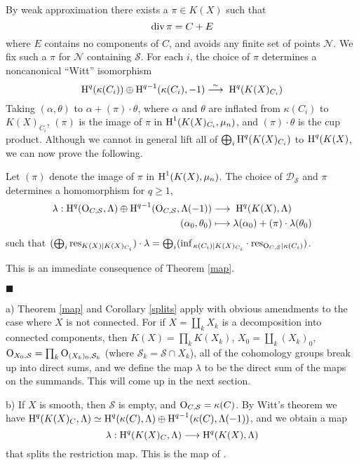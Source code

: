 \documentclass{amsart}
\theoremstyle{plain}
\theoremstyle{definition}
\theoremstyle{remark}
\numberwithin{equation}{section}%
\renewcommand{\H}{{\text{\rm H}}}
\renewcommand{\O}{{\text{\rm O}}}
\renewcommand{\S}{{\mathcal S}}
\renewcommand{\div}{{\text{\rm div}}}
\renewcommand{\inf}{{\text{\rm inf}\,}}
\newcommand{\isim}{{\;\overset{\sim}{\longrightarrow}\;}}
\newcommand{\isom}{{\;\simeq\;}}
\newcommand{\red}{{\text{\rm red}}}
\newcommand{\res}{{\text{\rm res}}}
\newcommand{\Pf}{{\noindent{\it Proof.}\;\;}}
\begin{document}
\Paragraph\label{pi}
By weak approximation \cite[Lemma]{Sa98}
there exists a $\pi\in K(X)$ such that 
$$
\div\,\pi=C+E
$$ 
where $E$ contains no components of $C$, and avoids any finite set of points $\mathcal N$.
We fix such a $\pi$ for $\mathcal N$ containing $\S$. 
For each $i$, the choice of $\pi$ determines a noncanonical ``Witt'' isomorphism 
\[
\H^q(\kappa(C_i))\oplus\H^{q-1}(\kappa(C_i),-1)\isim\;\H^q(K(X)_{C_i})
\]
Taking $(\alpha,\theta)$
to $\alpha+(\pi)\cdot\theta$, where $\alpha$ and $\theta$ are inflated from 
$\kappa(C_i)$ to $K(X)_{C_i}$,
$(\pi)$ is the image of $\pi$ in $\H^1(K(X)_{C_i},\mu_n)$, and $(\pi)\cdot\theta$
is the cup product.
Although we cannot in general lift all of
$\bigoplus_i\H^q(K(X)_{C_i})$ to $\H^q(K(X)$, we can now prove the following.

\Corollary\label{splits}
Let $(\pi)$ denote the image of $\pi$ in $\H^1(K(X),\mu_n)$.
The choice of $\mathscr D_\S$ and $\pi$ determines a homomorphism for $q\geq 1$,
\begin{align*}
\lambda:\H^q(\O_{C,\S},\Lambda)\oplus\H^{q-1}(\O_{C,\S},\Lambda(-1))&\longrightarrow\;\H^q(K(X),\Lambda)\\
(\alpha_0,\theta_0)&\longmapsto \lambda(\alpha_0)+(\pi)\cdot\lambda(\theta_0)
\end{align*}
such that $(\bigoplus_i\res_{K(X)|K(X)_{C_i}})\cdot\lambda
=\bigoplus_i(\inf_{\kappa(C_i)|K(X)_{C_i}}\cdot\res_{\O_{C,\S}|\kappa(C_i)})$.
\rm

\Pf
This is an immediate consequence of Theorem \ref{map}.

\hfill $\blacksquare$

\Remark\label{connected}
a) Theorem \ref{map} and Corollary \ref{splits} 
apply with obvious amendments to the case where $X$ is not connected.  
For if $X=\coprod_k X_k$ is a decomposition into connected components,
then $K(X)=\prod_k K(X_k)$, $X_0=\coprod_k(X_k)_0$, $\O_{X_0,\S}=\prod_k\O_{(X_k)_0,\S_k}$
(where $\S_k=\S\cap X_k$),
all of the cohomology groups break up into direct sums, and we define the map $\lambda$ 
to be the direct sum of the maps on the summands.
This will come up in the next section.


b) If $X$ is smooth, then $\S$ is empty, and $\O_{C,\S}=\kappa(C)$.
By Witt's theorem we have 
$\H^q(K(X)_C,\Lambda)\isom\H^q(\kappa(C),\Lambda)\oplus\H^{q-1}(\kappa(C),\Lambda(-1))$,
and we obtain a map
$$\lambda:\H^q(K(X)_C,\Lambda)\longrightarrow\H^q(K(X),\Lambda)$$
that splits the restriction map.
This is the map of \cite{BMT}.
\end{document}
